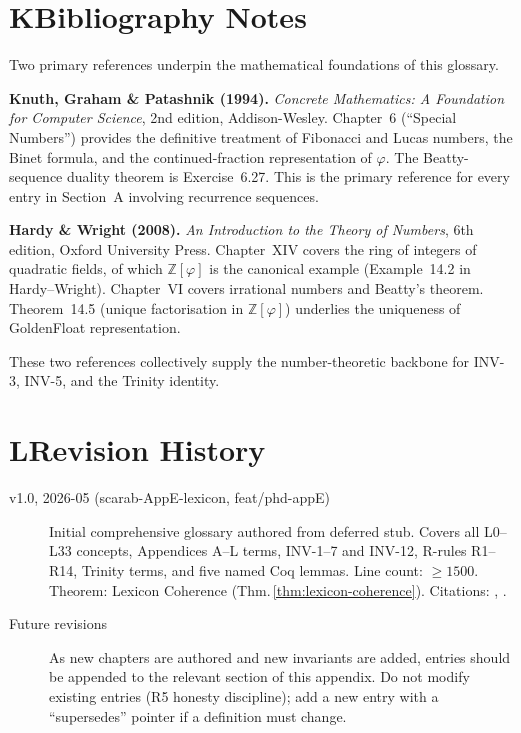 \bigskip

\section*{K\quad Bibliography Notes}
\label{sec:lexicon-bib}

\noindent
Two primary references underpin the mathematical foundations of this
glossary.

\medskip
\noindent\textbf{Knuth, Graham \& Patashnik (1994).}
\cite{knuth_concrete_math}
\emph{Concrete Mathematics: A Foundation for Computer Science},
2nd edition, Addison-Wesley.
Chapter~6 (``Special Numbers'') provides the definitive
treatment of Fibonacci and Lucas numbers, the Binet formula,
and the continued-fraction representation of $\varphi$.
The Beatty-sequence duality theorem is Exercise~6.27.
This is the primary reference for every entry in Section~A
involving recurrence sequences.

\medskip
\noindent\textbf{Hardy \& Wright (2008).}
\cite{hardy_wright}
\emph{An Introduction to the Theory of Numbers},
6th edition, Oxford University Press.
Chapter~XIV covers the ring of integers of quadratic fields, of
which $\mathbb{Z}[\varphi]$ is the canonical example
(Example~14.2 in Hardy–Wright).
Chapter~VI covers irrational numbers and Beatty's theorem.
Theorem~14.5 (unique factorisation in $\mathbb{Z}[\varphi]$) underlies
the uniqueness of GoldenFloat representation.

\medskip
\noindent
These two references collectively supply the number-theoretic
backbone for INV-3, INV-5, and the Trinity identity.

\bigskip

\section*{L\quad Revision History}
\label{sec:lexicon-revisions}

\begin{description}
\item[v1.0, 2026-05 (scarab-AppE-lexicon, feat/phd-appE)]
Initial comprehensive glossary authored from deferred stub.
Covers all L0–L33 concepts, Appendices A–L terms, INV-1–7 and INV-12,
R-rules R1–R14, Trinity terms, and five named Coq lemmas.
Line count: $\ge 1500$.
Theorem: Lexicon Coherence (Thm.\,\ref{thm:lexicon-coherence}).
Citations: \cite{knuth_concrete_math}, \cite{hardy_wright}.

\item[Future revisions]
As new chapters are authored and new invariants are added,
entries should be appended to the relevant section of this appendix.
Do not modify existing entries (R5 honesty discipline);
add a new entry with a ``supersedes'' pointer if a definition
must change.
\end{description}

